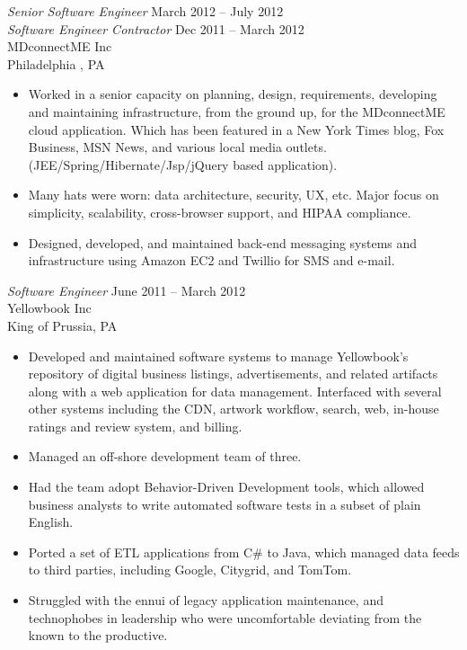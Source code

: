 \documentclass[margin]{res}
\begin{document}
\begin{resume}
  {\sl Senior Software Engineer} \hfill March 2012  -- July 2012 \\
  {\sl Software Engineer Contractor} \hfill Dec 2011 -- March 2012 \\
  MDconnectME Inc \\
  Philadelphia , PA
  \begin{itemize} \itemsep -2pt
    \item Worked in a senior capacity on planning, design, requirements, developing and maintaining infrastructure, from the ground up, for the MDconnectME cloud application. Which has been featured in a New York Times blog, Fox Business, MSN News, and various local media outlets.  (JEE/Spring/Hibernate/Jsp/jQuery based application).
    \item Many hats were worn: data architecture, security, UX, etc.  Major focus on simplicity, scalability, cross-browser support, and HIPAA compliance.
    \item Designed, developed, and maintained back-end messaging systems and infrastructure using Amazon EC2 and Twillio for SMS and e-mail.
  \end{itemize}


  {\sl Software Engineer} \hfill  June 2011 -- March 2012 \\
    Yellowbook Inc \\
    King of Prussia, PA
    \begin{itemize} \itemsep -2pt
      \item Developed and maintained software systems to manage Yellowbook's repository of digital business listings, advertisements, and related artifacts along with a web application for data management.
            Interfaced with several other systems including the CDN, artwork workflow, search, web, in-house ratings and review system, and billing.
      \item Managed an off-shore development team of three.
      \item Had the team adopt Behavior-Driven Development tools, which allowed business analysts to write automated software tests in a subset of plain English.
      \item Ported a set of ETL applications from C\# to Java, which managed data feeds to third parties, including Google, Citygrid, and TomTom.
      \item Struggled with the ennui of legacy application maintenance, and technophobes in leadership who were uncomfortable deviating from the known to the productive.
    \end{itemize}



\end{resume}
\end{document}

